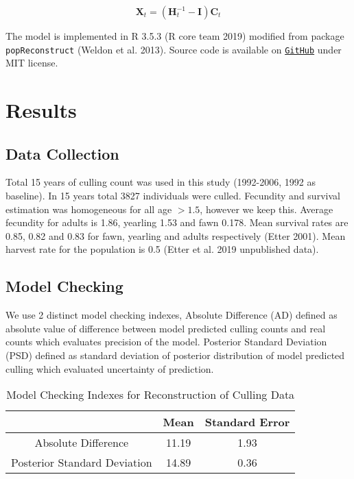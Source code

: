 \documentclass[]{article}
\begin{document}
\begin{equation}
\label{eqn.living}
\mathbf{X}_{t}=(\mathbf{H}_{t}^{-1}-\mathbf{I})\mathbf{C}_{t}
\end{equation}  


The model is implemented in R 3.5.3 (R core team 2019) modified from package \texttt{popReconstruct} (Weldon et al. 2013). Source code is available on \href{https://github.com/YunyiShen/DDLeslieReconstruct}{\texttt{GitHub}} under MIT license.

\section{Results}
\subsection{Data Collection}
Total 15 years of culling count was used in this study (1992-2006, 1992 as baseline). In 15 years total 3827 individuals were culled. Fecundity and survival estimation was homogeneous for all age $>1.5$, however we keep this. Average fecundity for adults is 1.86, yearling 1.53 and fawn 0.178. Mean survival rates are 0.85, 0.82 and 0.83 for fawn, yearling and adults respectively (Etter 2001). Mean harvest rate for the population is 0.5 (Etter et al. 2019 unpublished data).
\subsection{Model Checking}
We use 2 distinct model checking indexes, Absolute Difference (AD) defined as absolute value of difference between model predicted culling counts and real counts which evaluates precision of the model. Posterior Standard Deviation (PSD) defined as standard deviation of posterior distribution of model predicted culling which evaluated uncertainty of prediction.

\begin{table}[htbp] %
	\centering
	\caption{\label{tab:check}Model Checking Indexes for Reconstruction of Culling Data}
	\begin{tabular}{ccc}
		\toprule
		&Mean&Standard Error\\
		\midrule
		Absolute Difference&11.19 & 1.93\\
		Posterior Standard Deviation & 14.89 & 0.36\\
		\bottomrule
	\end{tabular}
\end{table}
\end{document}
